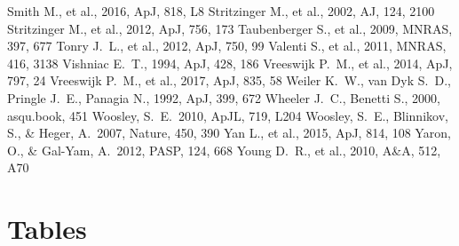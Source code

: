 \documentclass[useAMS,usenatbib]{mn2e}
\begin{document}
\begin{thebibliography}{99}
 Smith M., et al., 2016, ApJ, 818, L8 
 Stritzinger M., et al., 2002, AJ, 124, 
2100
 Stritzinger M., et al., 2012, ApJ, 756, 173 
 Taubenberger S., et al., 2009, MNRAS, 397, 677 
 Tonry J.~L., et al., 2012, ApJ, 750, 99 
 Valenti S., et al., 2011, MNRAS, 416, 3138
 Vishniac E.~T., 1994, ApJ, 428, 186 
 Vreeswijk P.~M., et al., 2014, ApJ, 797, 
24 
 Vreeswijk P.~M., et al., 2017, ApJ, 835, 58 
 Weiler K.~W., van Dyk S.~D., Pringle J.~E., Panagia N., 1992, ApJ, 399, 672
 Wheeler J.~C., Benetti S., 2000, asqu.book, 451  
 Woosley, S.~E.\ 2010, ApJL, 
719, L204
 Woosley, S.~E., 
Blinnikov, S., \& Heger, A.\ 2007, Nature, 450, 390
 Yan L., et al., 2015, ApJ, 814, 108 
 Yaron, O., \& Gal-Yam, A.\ 2012, PASP, 124, 668 
 Young D.~R., et al., 2010, A\&A, 512, A70 
\end{thebibliography}

\appendix


\section{Tables}
\end{document}
